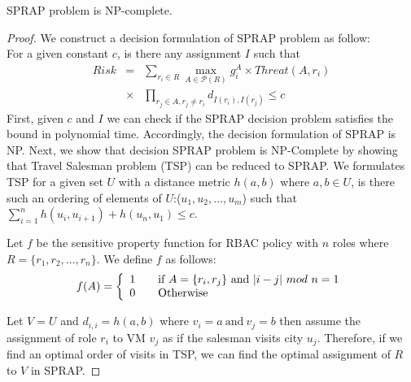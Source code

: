 \begin{theorem}
SPRAP problem is NP-complete.
\end{theorem} 
\begin{proof}
We construct a decision  formulation of SPRAP problem as follow:\\
For a given constant $c$, is there any assignment  $I$ such that 
\begin{eqnarray*}
Risk&=&\sum_{r_i \in R} \max_{A \in \mathcal{P}(R)} g_i^{A}\times Threat(A,r_i) \\
&\times& \prod_{r_j \in A,r_j \neq r_i} d_{I(r_i),I(r_j)}  \le c
\end{eqnarray*}
First, given $c$ and $I$ we can check if the SPRAP decision problem satisfies the bound in polynomial time. Accordingly, the decision formulation of SPRAP is NP. Next, we show that decision SPRAP problem is NP-Complete by showing that  Travel Salesman problem (TSP) can be reduced to SPRAP. We formulates TSP for a given set $U$ with a distance metric $h(a,b)$ where $a,b \in U$, is there such an ordering of elements of $U$:($u_1,u_2,...,u_m$) such that $\sum_{i=1}^n h(u_i,u_{i+1})+h(u_n,u_1) \leq c$.

Let  $f$ be the sensitive property function for  RBAC policy with $n$ roles where $R= \lbrace r_1,r_2, \dots , r_n \rbrace$.  We define $f$ as follows:
\[ f(A) = \left  \{
  \begin{array}{l l}
    1 & \quad  \text{if} \ A = \lbrace r_i, r_j \rbrace\ \text{and} \ |i-j| \ mod \ n = 1\\
    0 & \quad \text{Otherwise}
\end{array} \right.\]

Let  $V = U$  and $d_{i,i} = h(a,b)$ where $v_i= a \ \text{and} \ v_j = b$ then assume the assignment of role $r_i$ to VM $v_j$ as if the salesman visits city $u_j$. Therefore, if we find an optimal order of visits in TSP, we can find the optimal assignment of $R$  to $V$ in SPRAP.
\end{proof} 
